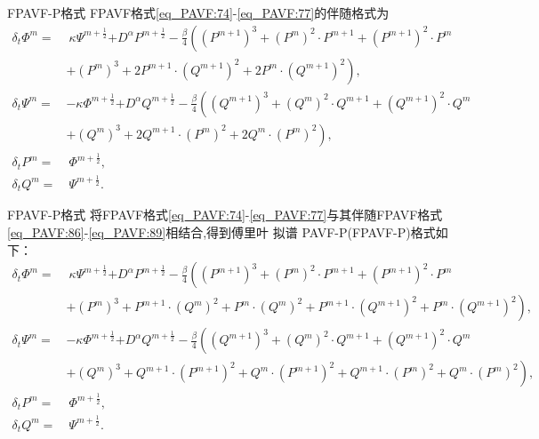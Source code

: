 \documentclass[aspectratio=169]{beamer}
\numberwithin{theorem}{section} %
\begin{document}
\begin{frame}{FPAVF-P格式}
	FPAVF格式\eqref{eq_PAVF:74}-\eqref{eq_PAVF:77}的伴随格式为
	\begin{align}
	\delta_{t} \varPhi^{m}=&~\kappa \Psi^{m+\frac{1}{2}}{+D^{\alpha} P^{m+\frac{1}{2}}}-\frac{\beta}{4}\left( (P^{m+1})^3+ (P^{m})^{2}\cdot P^{m+1}+(P^{m+1})^{2}\cdot P^{m}\right.\nonumber\\
		&\left.+ (P^{m})^{3}+2 P^{m+1}\cdot (Q^{m+1})^{2}+2 P^{m}\cdot (Q^{m+1})^{2}\right),\label{eq_PAVF:86}\\
	\delta_{t} \Psi^{m}=&-\kappa \varPhi^{m+\frac{1}{2}}{+D^{\alpha} Q^{m+\frac{1}{2}}}-\frac{\beta}{4}\left( (Q^{m+1})^3+ (Q^{m})^{2}\cdot Q^{m+1}+ (Q^{m+1})^{2}\cdot Q^{m}\right.\nonumber\\
		&\left.+ (Q^{m})^{3}+2 Q^{m+1}\cdot (P^{m})^{2}+2 Q^{m}\cdot (P^{m})^{2}\right),\label{eq_PAVF:87}\\
	\delta_{t} P^{m}=&~\varPhi^{m+\frac{1}{2}},\label{eq_PAVF:88}\\
	\delta_{t} Q^{m}=&~\Psi^{m+\frac{1}{2}}.\label{eq_PAVF:89}
	\end{align}
	
\end{frame}
\begin{frame}{FPAVF-P格式}
	将FPAVF格式\eqref{eq_PAVF:74}-\eqref{eq_PAVF:77}与其伴随FPAVF格式\eqref{eq_PAVF:86}-\eqref{eq_PAVF:89}相结合,得到傅里叶 拟谱 PAVF-P(FPAVF-P)格式如下：
	\begin{align}
	\delta_{t} \varPhi^{m}=&~\kappa \Psi^{m+\frac{1}{2}}{+D^{\alpha} P^{m+\frac{1}{2}}}-\frac{\beta}{4}\left((P^{m+1})^3+(P^{m})^{2}\cdot P^{m+1}+(P^{m+1})^{2}\cdot P^{m}\right.\nonumber\\
		&\left.+(P^{m})^{3}+P^{m+1}\cdot (Q^{m})^{2}+P^{m}\cdot (Q^{m})^{2}+P^{m+1}\cdot (Q^{m+1})^{2}+P^{m}\cdot (Q^{m+1})^{2}\right),\label{eq_PAVF:98}\\
	\delta_{t} \Psi^{m}=&-\kappa \varPhi^{m+\frac{1}{2}}{+D^{\alpha} Q^{m+\frac{1}{2}}}-\frac{\beta}{4}\left((Q^{m+1})^3+(Q^{m})^{2}\cdot Q^{m+1}+(Q^{m+1})^{2}\cdot Q^{m}\right.\nonumber\\
		&\left.+(Q^{m})^{3}+Q^{m+1}\cdot (P^{m+1})^{2}+Q^{m}\cdot (P^{m+1})^{2}+Q^{m+1}\cdot (P^{m})^{2}+Q^{m}\cdot (P^{m})^{2}\right),\label{eq_PAVF:99}\\
	\delta_{t} P^{m}=&~\varPhi^{m+\frac{1}{2}},\label{eq_PAVF:100}\\
	\delta_{t} Q^{m}=&~\Psi^{m+\frac{1}{2}}.\label{eq_PAVF:101}
	\end{align}
	
\end{frame}
\end{document}
